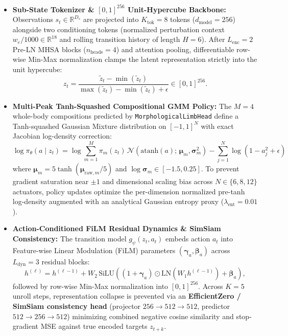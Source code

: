 \documentclass[11pt,a4paper]{article}
\begin{document}
\begin{itemize}
    \item \textbf{Sub-State Tokenizer \& $[0, 1]^{256}$ Unit-Hypercube Backbone:} Observations $s_t \in \mathbb{R}^{D_s}$ are projected into $K_{\text{tok}} = 8$ tokens ($d_{\text{model}} = 256$) alongside two conditioning tokens (normalized perturbation context $w_e / 1000 \in \mathbb{R}^{18}$ and rolling transition history of length $H = 6$). After $L_{\text{enc}} = 2$ Pre-LN MHSA blocks ($n_{\text{heads}} = 4$) and attention pooling, differentiable row-wise Min-Max normalization clamps the latent representation strictly into the unit hypercube:
    \begin{equation}
        z_t = \frac{\tilde{z}_t - \min(\tilde{z}_t)}{\max(\tilde{z}_t) - \min(\tilde{z}_t) + \epsilon} \in [0, 1]^{256}.
    \end{equation}
    \item \textbf{Multi-Peak Tanh-Squashed Compositional GMM Policy:} The $M = 4$ whole-body compositions predicted by \texttt{MorphologicalLimbHead} define a Tanh-squashed Gaussian Mixture distribution on $[-1, 1]^N$ with exact Jacobian log-density correction:
    \begin{equation}
        \log \pi_\theta(a \mid z_t) = \log \sum_{m=1}^M \pi_m(z_t)\, \mathcal{N}(\text{atanh}(a);\, \boldsymbol{\mu}_m, \boldsymbol{\sigma}_m^2) - \sum_{j=1}^N \log(1 - a_j^2 + \epsilon)
    \end{equation}
    where $\boldsymbol{\mu}_m = 5\tanh(\boldsymbol{\mu}_{\text{raw},m}/5)$ and $\log \boldsymbol{\sigma}_m \in [-1.5, 0.25]$. To prevent gradient saturation near $\pm 1$ and dimensional scaling bias across $N \in \{6, 8, 12\}$ actuators, policy updates optimize the per-dimension normalized pre-tanh log-density augmented with an analytical Gaussian entropy proxy ($\lambda_{\text{ent}} = 0.01$).
    \item \textbf{Action-Conditioned FiLM Residual Dynamics \& SimSiam Consistency:} The transition model $g_\psi(z_t, a_t)$ embeds action $a_t$ into Feature-wise Linear Modulation (FiLM) parameters $(\boldsymbol{\gamma}_a, \boldsymbol{\beta}_a)$ across $L_{\text{dyn}} = 3$ residual blocks:
    \begin{equation}
        h^{(\ell)} = h^{(\ell-1)} + W_2\,\text{SiLU}\!\left((1 + \boldsymbol{\gamma}_a) \odot \text{LN}(W_1 h^{(\ell-1)}) + \boldsymbol{\beta}_a\right),
    \end{equation}
    followed by row-wise Min-Max normalization into $[0, 1]^{256}$. Across $K = 5$ unroll steps, representation collapse is prevented via an \textbf{EfficientZero / SimSiam consistency head} \cite{chen2021exploring,ye2021mastering} (projector $256 \to 512 \to 512$, predictor $512 \to 256 \to 512$) minimizing combined negative cosine similarity and stop-gradient MSE against true encoded targets $z_{t+k}$.

\end{itemize}
\end{document}
